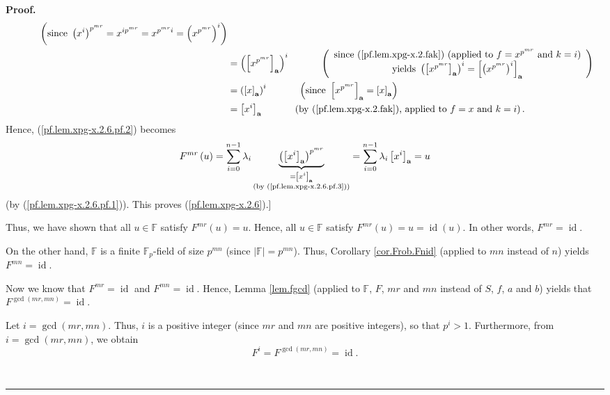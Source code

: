 \documentclass[numbers=enddot,12pt,final,onecolumn,notitlepage]{scrartcl}%
\theoremstyle{definition}
\newenvironment{proof}[1][Proof]{\noindent\textbf{#1.} }{\ \rule{0.5em}{0.5em}}
\let\sumnonlimits\sum
\renewcommand{\sum}{\sumnonlimits\limits}
\begin{document}
\begin{proof}
\begin{align}
{}\ \ \ \ \ \ \ \ \ \ \left(  \text{since }\left(  x^{i}\right)  ^{p^{mr}%
}=x^{ip^{mr}}=x^{p^{mr}i}=\left(  x^{p^{mr}}\right)  ^{i}\right) \nonumber\\
&  =\left(  \left[  x^{p^{mr}}\right]  _{\mathbf{a}}\right)  ^{i}%
\ \ \ \ \ \ \ \ \ \ \left(
\begin{array}
[c]{c}%
\text{since (\ref{pf.lem.xpg-x.2.fak}) (applied to }f=x^{p^{mr}}\text{ and
}k=i\text{)}\\
\text{yields }\left(  \left[  x^{p^{mr}}\right]  _{\mathbf{a}}\right)
^{i}=\left[  \left(  x^{p^{mr}}\right)  ^{i}\right]  _{\mathbf{a}}%
\end{array}
\right) \nonumber\\
&  =\left(  \left[  x\right]  _{\mathbf{a}}\right)  ^{i}%
\ \ \ \ \ \ \ \ \ \ \left(  \text{since }\left[  x^{p^{mr}}\right]
_{\mathbf{a}}=\left[  x\right]  _{\mathbf{a}}\right) \nonumber\\
&  =\left[  x^{i}\right]  _{\mathbf{a}}\ \ \ \ \ \ \ \ \ \ \left(  \text{by
(\ref{pf.lem.xpg-x.2.fak}), applied to }f=x\text{ and }k=i\right)  .
\label{pf.lem.xpg-x.2.6.pf.3}%
\end{align}
Hence, (\ref{pf.lem.xpg-x.2.6.pf.2}) becomes%
\[
F^{mr}\left(  u\right)  =\sum_{i=0}^{n-1}\lambda_{i}\underbrace{\left(
\left[  x^{i}\right]  _{\mathbf{a}}\right)  ^{p^{mr}}}_{\substack{=\left[
x^{i}\right]  _{\mathbf{a}}\\\text{(by (\ref{pf.lem.xpg-x.2.6.pf.3}))}}%
}=\sum_{i=0}^{n-1}\lambda_{i}\left[  x^{i}\right]  _{\mathbf{a}}=u
\]
(by (\ref{pf.lem.xpg-x.2.6.pf.1})). This proves (\ref{pf.lem.xpg-x.2.6}).]

Thus, we have shown that all $u\in\mathbb{F}$ satisfy $F^{mr}\left(  u\right)
=u$. Hence, all $u\in\mathbb{F}$ satisfy $F^{mr}\left(  u\right)
=u=\operatorname*{id}\left(  u\right)  $. In other words, $F^{mr}%
=\operatorname*{id}$.

On the other hand, $\mathbb{F}$ is a finite $\mathbb{F}_{p}$-field of size
$p^{mn}$ (since $\left\vert \mathbb{F}\right\vert =p^{mn}$). Thus, Corollary
\ref{cor.Frob.Fnid} (applied to $mn$ instead of $n$) yields $F^{mn}%
=\operatorname*{id}$.

Now we know that $F^{mr}=\operatorname*{id}$ and $F^{mn}=\operatorname*{id}$.
Hence, Lemma \ref{lem.fgcd} (applied to $\mathbb{F}$, $F$, $mr$ and $mn$
instead of $S$, $f$, $a$ and $b$) yields that $F^{\gcd\left(  mr,mn\right)
}=\operatorname*{id}$.

Let $i=\gcd\left(  mr,mn\right)  $. Thus, $i$ is a positive integer (since
$mr$ and $mn$ are positive integers), so that $p^{i}>1$. Furthermore, from
$i=\gcd\left(  mr,mn\right)  $, we obtain%
\[
F^{i}=F^{\gcd\left(  mr,mn\right)  }=\operatorname*{id}.
\]



\end{proof}
\end{document}

